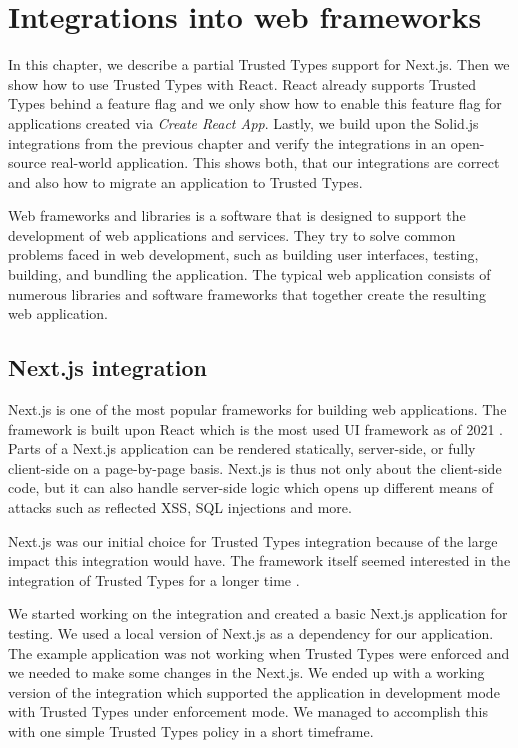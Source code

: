 \chapter{Integrations into web frameworks}

In this chapter, we describe a partial Trusted Types support for Next.js. Then we show how to use
Trusted Types with React. React already supports Trusted Types behind a feature flag and we only
show how to enable this feature flag for applications created via \emph{Create React App}. Lastly,
we build upon the Solid.js integrations from the previous chapter and verify the integrations in an
open-source real-world application. This shows both, that our integrations are correct and also how
to migrate an application to Trusted Types.

Web frameworks and libraries is a software that is designed to support the deve\-lopment of web
applications and services. They try to solve common problems faced in web development, such as
building user interfaces, testing, building, and bundling the application. The typical web
application consists of numerous libraries and software frameworks that together create the
resulting web application.

\section{Next.js integration}
\label{intro-nextjs}

Next.js is one of the most popular frameworks for building web applications. The framework is built
upon React which is the most used UI framework as of 2021 \cite{react_most_used_2021}. Parts of a
Next.js application can be rendered statically, server-side, or fully client-side on a page-by-page
basis. Next.js is thus not only about the client-side code, but it can also handle server-side logic
which opens up different means of attacks such as reflected XSS, SQL injections and more.

Next.js was our initial choice for Trusted Types integration because of the large impact this
integration would have. The framework itself seemed interested in the integration of Trusted Types
for a longer time \cite{nextjs_tt_pr_2020}.

We started working on the integration and created a basic Next.js application for testing. We used a
local version of Next.js as a dependency for our application. The example application was not
working when Trusted Types were enforced and we needed to make some changes in the Next.js. We ended
up with a working version of the integration which supported the application in development mode
with Trusted Types under enforcement mode. We managed to accomplish this with one simple Trusted
Types policy in a short timeframe.

